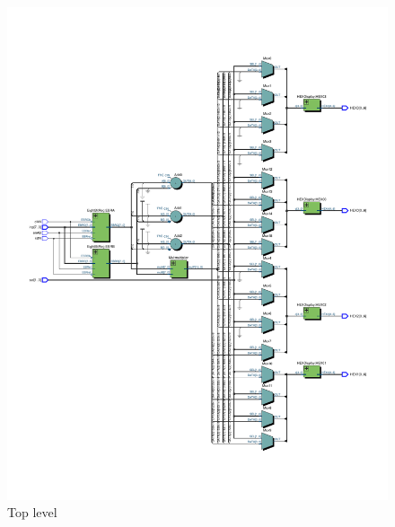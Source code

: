 \documentclass[13pt,a4paper]{report}
\begin{document}
\begin{figure}[H]
\end{figure}


\begin{figure}[H]
\centering
\includegraphics[scale=0.85, clip, trim={0cm 2cm 0cm 2cm}]{images/Exc4_RTL.pdf}
\caption*{Top level}
\end{figure}
\end{document}
